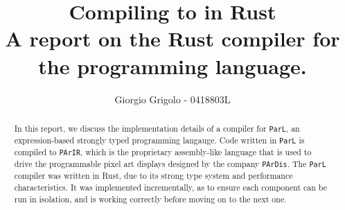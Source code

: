 \documentclass{article}
\title{Compiling \code{ParL} to \code{PArIR} in Rust \\{\normalsize A report on the Rust
compiler for the \code{ParL} programming language.}}
\author{Giorgio Grigolo - 0418803L}
\date{}
\newcommand{\code}[1]{\texttt{#1}}
\begin{document}
\maketitle
\tableofcontents

\vfill

\thispagestyle{empty}

\begin{abstract}
      In this report, we discuss the implementation details of a
      compiler for \code{ParL}, an expression-based strongly typed programming
      langauge. Code written in \code{ParL} is compiled to \code{PArIR}, which is
      the proprietary assembly-like language that is used to drive the
      programmable pixel art displays designed by the company \code{PArDis}. The
      \code{ParL} compiler was written in Rust, due to its strong type system and
      performance characteristics. It was implemented incrementally, as
      to ensure each component can be run in isolation, and is working correctly
      before moving on to the next one.
\end{abstract}

\vfill
\newpage

\newpage


\newpage

\newpage





\newpage

\printbibliography
\end{document}

